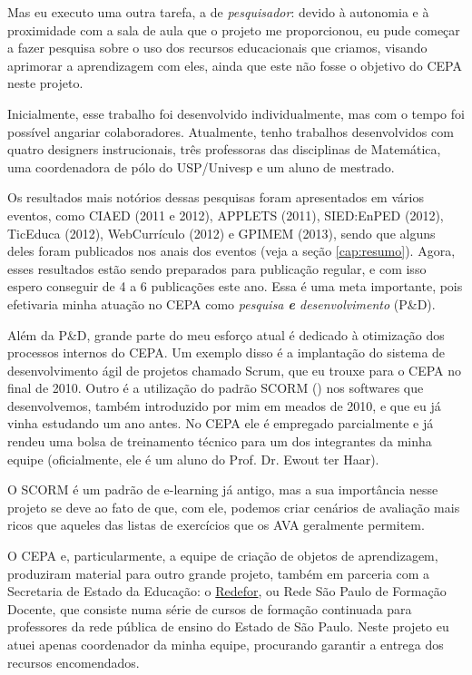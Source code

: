 Mas eu executo uma outra tarefa, a de \emph{pesquisador}: devido à autonomia e à proximidade com a sala de aula que o projeto me proporcionou, eu pude começar a fazer pesquisa sobre o uso dos recursos educacionais que criamos, visando aprimorar a aprendizagem com eles, ainda que este não fosse o objetivo do CEPA neste projeto.

Inicialmente, esse trabalho foi desenvolvido individualmente, mas com o tempo foi possível angariar colaboradores. Atualmente, tenho trabalhos desenvolvidos com quatro designers instrucionais, três professoras das disciplinas de Matemática, uma coordenadora de pólo do USP/Univesp e um aluno de mestrado.

Os resultados mais notórios dessas pesquisas foram apresentados em vários eventos, como CIAED (2011 e 2012), APPLETS (2011), SIED:EnPED (2012), TicEduca (2012), WebCurrículo (2012) e GPIMEM (2013), sendo que alguns deles foram publicados nos anais dos eventos (veja a seção \ref{cap:resumo}). Agora, esses resultados estão sendo preparados para publicação regular, e com isso espero conseguir de 4 a 6 publicações este ano. Essa é uma meta importante, pois efetivaria minha atuação no CEPA como \emph{pesquisa \textbf{e} desenvolvimento} (P\&D).

Além da P\&D, grande parte do meu esforço atual é dedicado à otimização dos processos internos do CEPA. Um exemplo disso é a implantação do sistema de desenvolvimento ágil de projetos chamado Scrum, que eu trouxe para o CEPA no final de 2010. Outro é a utilização do padrão SCORM () nos softwares que desenvolvemos, também introduzido por mim em meados de 2010, e que eu já vinha estudando um ano antes. No CEPA ele é empregado parcialmente e já rendeu uma bolsa de treinamento técnico para um dos integrantes da minha equipe (oficialmente, ele é um aluno do Prof. Dr. Ewout ter Haar).

O SCORM é um padrão de e-learning já antigo, mas a sua importância nesse projeto se deve ao fato de que, com ele, podemos criar cenários de avaliação mais ricos que aqueles das listas de exercícios que os AVA geralmente permitem.

O CEPA e, particularmente, a equipe de criação de objetos de aprendizagem, produziram material para outro grande projeto, também em parceria com a Secretaria de Estado da Educação: o \href{http://redefor.usp.br/}{Redefor}, ou Rede São Paulo de Formação Docente, que consiste numa série de cursos de formação continuada para professores da rede pública de ensino do Estado de São Paulo. Neste projeto eu atuei apenas coordenador da minha equipe, procurando garantir a entrega dos recursos encomendados.

